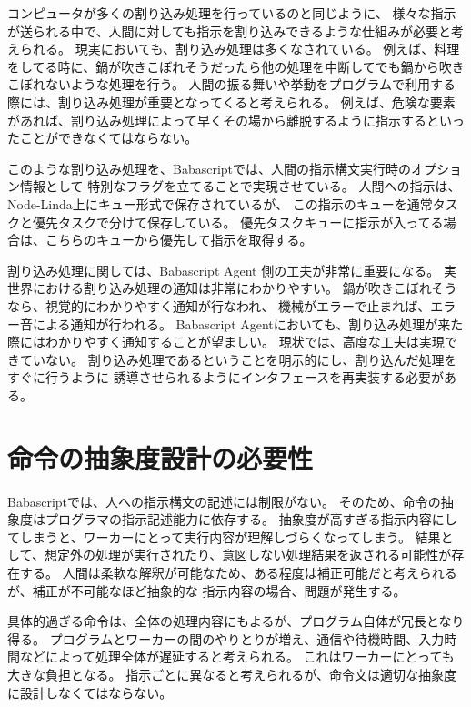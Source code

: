 コンピュータが多くの割り込み処理を行っているのと同じように、
様々な指示が送られる中で、人間に対しても指示を割り込みできるような仕組みが必要と考えられる。
現実においても、割り込み処理は多くなされている。
例えば、料理をしてる時に、鍋が吹きこぼれそうだったら他の処理を中断してでも鍋から吹きこぼれないような処理を行う。
人間の振る舞いや挙動をプログラムで利用する際には、割り込み処理が重要となってくると考えられる。
例えば、危険な要素があれば、割り込み処理によって早くその場から離脱するように指示するといったことができなくてはならない。

このような割り込み処理を、Babascriptでは、人間の指示構文実行時のオプション情報として
特別なフラグを立てることで実現させている。
人間への指示は、Node-Linda上にキュー形式で保存されているが、
この指示のキューを通常タスクと優先タスクで分けて保存している。
優先タスクキューに指示が入ってる場合は、こちらのキューから優先して指示を取得する。

割り込み処理に関しては、Babascript Agent 側の工夫が非常に重要になる。
実世界における割り込み処理の通知は非常にわかりやすい。
鍋が吹きこぼれそうなら、視覚的にわかりやすく通知が行なわれ、
機械がエラーで止まれば、エラー音による通知が行われる。 Babascript
Agentにおいても、割り込み処理が来た際にはわかりやすく通知することが望ましい。
現状では、高度な工夫は実現できていない。
割り込み処理であるということを明示的にし、割り込んだ処理をすぐに行うように
誘導させられるようにインタフェースを再実装する必要がある。

\section{命令の抽象度設計の必要性}\label{ux547dux4ee4ux306eux62bdux8c61ux5ea6ux8a2dux8a08ux306eux5fc5ux8981ux6027}

Babascriptでは、人への指示構文の記述には制限がない。
そのため、命令の抽象度はプログラマの指示記述能力に依存する。
抽象度が高すぎる指示内容にしてしまうと、ワーカーにとって実行内容が理解しづらくなってしまう。
結果として、想定外の処理が実行されたり、意図しない処理結果を返される可能性が存在する。
人間は柔軟な解釈が可能なため、ある程度は補正可能だと考えられるが、補正が不可能なほど抽象的な
指示内容の場合、問題が発生する。

具体的過ぎる命令は、全体の処理内容にもよるが、プログラム自体が冗長となり得る。
プログラムとワーカーの間のやりとりが増え、通信や待機時間、入力時間などによって処理全体が遅延すると考えられる。
これはワーカーにとっても大きな負担となる。
指示ごとに異なると考えられるが、命令文は適切な抽象度に設計しなくてはならない。

